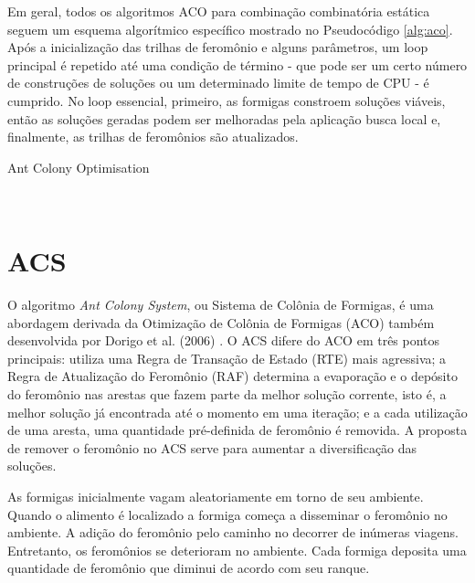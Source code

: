 Em geral, todos os algoritmos ACO para combinação combinatória estática seguem um esquema algorítmico específico mostrado no Pseudocódigo \ref{alg:aco}. Após a inicialização das trilhas de feromônio e alguns parâmetros, um loop principal é repetido até uma condição de término - que pode ser um certo número de construções de soluções ou um determinado limite de tempo de CPU - é cumprido. No loop essencial, primeiro, as formigas constroem soluções viáveis, então as soluções geradas podem ser melhoradas pela aplicação busca local e, finalmente, as trilhas de feromônios são atualizados.

\begin{algorithm}
	\caption{Ant Colony Optimisation}\label{alg:aco}
	\begin{algorithmic}[1]
		\small
        \
	\end{algorithmic}
\end{algorithm}

\section{ACS}
\label{sec-acs}

O algoritmo \textit{Ant Colony System}, ou Sistema de Colônia de Formigas, é  uma abordagem derivada da Otimização de Colônia de Formigas (ACO) também desenvolvida por Dorigo et al. (2006) \cite{dorigo2008particle}. O ACS difere do ACO em três pontos principais: utiliza uma Regra de Transação de Estado (RTE) mais agressiva; a Regra de Atualização do Feromônio (RAF) determina a evaporação e o depósito do feromônio nas arestas que fazem parte da melhor solução corrente, isto é, a melhor solução já encontrada até o momento em uma iteração; e a cada utilização de uma aresta, uma quantidade pré-definida de feromônio é removida. A proposta de remover o feromônio no ACS serve para aumentar a diversificação das soluções.

As formigas inicialmente vagam aleatoriamente em torno de seu ambiente. Quando o alimento é localizado a formiga começa a disseminar o feromônio no ambiente. A adição do feromônio pelo caminho no decorrer de inúmeras viagens. Entretanto, os feromônios se deterioram no ambiente. Cada formiga deposita uma quantidade de feromônio que diminui de acordo com seu ranque.

